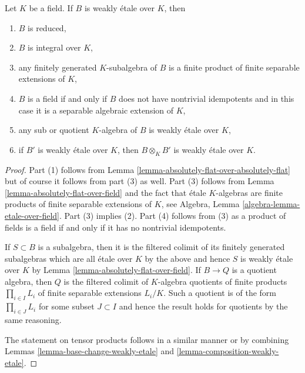 \begin{lemma}
\label{lemma-class-weakly-etale-over-field}
Let $K$ be a field. If $B$ is weakly \'etale over $K$, then
\begin{enumerate}
\item $B$ is reduced,
\item $B$ is integral over $K$,
\item any finitely generated $K$-subalgebra of $B$ is a finite product
of finite separable extensions of $K$,
\item $B$ is a field if and only if $B$ does not have nontrivial idempotents
and in this case it is a separable algebraic extension of $K$,
\item any sub or quotient $K$-algebra of $B$ is weakly \'etale over $K$,
\item if $B'$ is weakly \'etale over $K$, then $B \otimes_K B'$ is
weakly \'etale over $K$.
\end{enumerate}
\end{lemma}

\begin{proof}
Part (1) follows from Lemma \ref{lemma-absolutely-flat-over-absolutely-flat}
but of course it follows from part (3) as well.
Part (3) follows from Lemma \ref{lemma-absolutely-flat-over-field}
and the fact that \'etale $K$-algebras are finite products of
finite separable extensions of $K$, see
Algebra, Lemma \ref{algebra-lemma-etale-over-field}.
Part (3) implies (2).
Part (4) follows from (3) as a product of fields is
a field if and only if it has no nontrivial idempotents.

\medskip\noindent
If $S \subset B$ is a subalgebra, then it is the filtered
colimit of its finitely generated subalgebras which are
all \'etale over $K$ by the above and hence
$S$ is weakly \'etale over $K$ by
Lemma \ref{lemma-absolutely-flat-over-field}.
If $B \to Q$ is a quotient algebra, then
$Q$ is the filtered colimit of $K$-algebra quotients of
finite products $\prod_{i \in I} L_i$ of finite separable extensions
$L_i/K$. Such a quotient is of the form $\prod_{i \in J} L_i$
for some subset $J \subset I$ and hence the result
holds for quotients by the same reasoning.

\medskip\noindent
The statement on tensor products follows in a similar manner
or by combining Lemmas \ref{lemma-base-change-weakly-etale} and
\ref{lemma-composition-weakly-etale}.
\end{proof}
